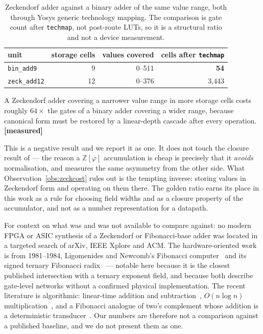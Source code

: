 \begin{table}[t]\centering
\caption{Zeckendorf adder against a binary adder of the same value range, both
through Yosys generic technology mapping. The comparison is gate count after
\texttt{techmap}, not post-route LUTs, so it is a structural ratio and not a
device measurement.}
\label{tab:zeckcost}
\begin{tabular}{lrrr}
\toprule
unit & storage cells & values covered & cells after \texttt{techmap} \\
\midrule
\texttt{bin\_add9}   & 9  & 0--511 & \textbf{54} \\
\texttt{zeck\_add12} & 12 & 0--376 & 3{,}443 \\
\bottomrule
\end{tabular}
\end{table}

\begin{observation}
\label{obs:zeckcost}
A Zeckendorf adder covering a narrower value range in more storage cells costs
roughly $64\times$ the gates of a binary adder covering a wider range, because
canonical form must be restored by a linear-depth cascade after every operation.
\textbf{[measured]}
\end{observation}

This is a negative result and we report it as one. It does not touch the closure
result of  --- the reason a $\mathbb{Z}[\varphi]$
accumulation is cheap is precisely that it \emph{avoids} normalisation, and
 measures the same asymmetry from the other side. What
Observation~\ref{obs:zeckcost} rules out is the tempting inverse: storing values
in Zeckendorf form and operating on them there. The golden ratio earns its place
in this work as a rule for choosing field widths and as a closure property of the
accumulator, and not as a number representation for a datapath.

For context on what was and was not available to compare against: no modern
FPGA or ASIC synthesis of a Zeckendorf or Fibonacci-base adder was located in a
targeted search of arXiv, IEEE Xplore and ACM. The hardware-oriented work is from
1981--1984, Ligomenides and Newcomb's Fibonacci
computer~\cite{ligomenides1981complement} and its signed ternary Fibonacci
radix~\cite{ligomenides1984multilevel} --- notable here because it is the
closest published intersection with a ternary exponent field, and because both
describe gate-level networks without a confirmed physical implementation. The
recent literature is algorithmic: linear-time addition and
subtraction~\cite{ahlbach2012efficient}, $O(n\log n)$
multiplication~\cite{idziaszek2021efficient}, and a Fibonacci analogue of
two's complement whose addition is a deterministic
transducer~\cite{labbe2022fibonacci}. Our numbers are therefore not a comparison
against a published baseline, and we do not present them as one.

